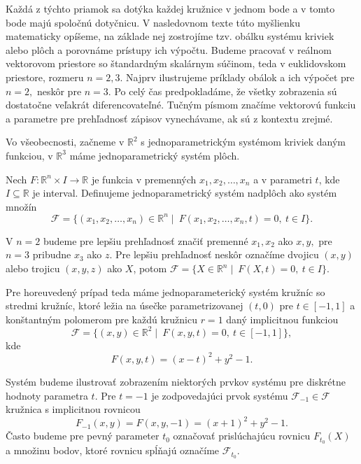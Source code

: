 Každá z týchto priamok sa dotýka každej kružnice v jednom bode a v tomto bode majú spoločnú dotyčnicu. V nasledovnom texte túto myšlienku matematicky opíšeme, na základe nej zostrojíme tzv. obálku systému kriviek alebo plôch a porovnáme prístupy ich výpočtu. Budeme pracovať v reálnom vektorovom priestore so štandardným skalárnym súčinom, teda v euklidovskom priestore, rozmeru $n = 2, 3.$ Najprv ilustrujeme príklady obálok a ich výpočet pre $ n = 2,$ neskôr pre $n = 3.$ Po celý čas predpokladáme, že všetky zobrazenia sú dostatočne veľakrát diferencovateľné. Tučným písmom značíme vektorovú funkciu a parametre pre prehľadnosť zápisov vynechávame, ak sú z kontextu zrejmé.

Vo všeobecnosti, začneme v $\mathbb{R}^2$ s jednoparametrickým systémom kriviek daným funkciou, v $\mathbb{R}^3$ máme jednoparametrický systém plôch.

\begin{definition}
Nech $F \colon \mathbb{R}^{n} \times I \rightarrow \mathbb{R}$ je funkcia v premenných $ x_{1}, x_{2}, \ldots, x_{n} $ a v parametri $t$, kde $I \subseteq \mathbb{R}$ je interval. Definujeme jednoparametrický systém nadplôch ako systém množín 
$$
\mathcal{F} = \{ (x_{1}, x_{2}, \ldots, x_{n}) \in \mathbb{R}^{n} \mid  \ F(x_{1}, x_{2}, \ldots, x_{n}, t) = 0, \ t \in I \}.
$$
\end{definition}

V $n = 2$ budeme pre lepšiu prehľadnosť značiť premenné $x_{1}, x_{2}$ ako $x, y,$ pre $n = 3$ pribudne $x_{3}$ ako $z.$ Pre lepšiu prehľadnosť neskôr označíme dvojicu $(x,y)$ alebo trojicu $(x,y,z)$ ako $X$, potom
$\mathcal{F} = \{ X \in \mathbb{R}^{n} \mid \ F(X, t) = 0, \ t \in I \}. $

Pre horeuvedený prípad teda máme jednoparameterický systém kružníc so stredmi kružníc, ktoré ležia na úsečke parametrizovanej $(t,0)$ pre $t \in [-1,1]$ a konštantným polomerom pre každú kružnicu $r = 1$ daný implicitnou funkciou
$$ \mathcal{F} = \{ (x, y) \in \mathbb{R}^{2} \mid \ F(x, y, t) = 0, \ t \in [-1,1] \}, $$
kde
$$ F(x, y, t) = (x - t)^2 + y^2 - 1.$$

Systém budeme ilustrovať zobrazením niektorých prvkov systému pre diskrétne hodnoty parametra $t$. Pre $t = -1$ je zodpovedajúci prvok systému $\mathcal{F}_{-1} \in \mathcal{F}$  kružnica s implicitnou rovnicou
$$ F_{-1}(x, y) = F(x, y, -1) = (x + 1)^2 + y^2 - 1. $$
Často budeme pre pevný parameter $t_0$ označovať prislúchajúcu rovnicu $F_{t_0}(X)$ a množinu bodov, ktoré rovnicu spĺňajú označíme $\mathcal{F}_{t_0}.$

